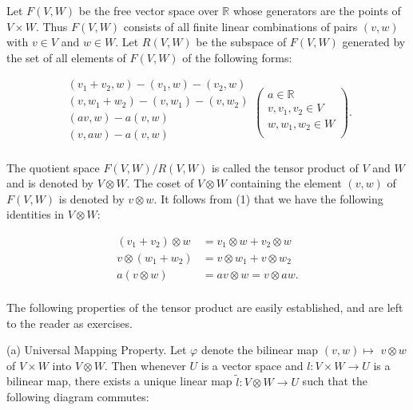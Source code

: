 \begin{definition}\label{thm:2.1}
Let $F(V,W)$ be the free vector space over $\mathbb{R}$ whose generators are the points of $V \times W$. Thus $F(V,W)$ consists of all finite linear combinations of pairs $(v,w)$ with $v \in V$ and $w \in W$. Let $R(V,W)$ be the subspace of $F(V,W)$ generated by the set of all elements of $F(V,W)$ of the following forms:

\begin{equation}
\tag{1}\label{eq:2.1:1}
\begin{array}{l}{(v_{1}+v_{2},w)-(v_{1},w)-(v_{2},w)}\\ {(v,w_{1}+w_{2})-(v,w_{1})-(v,w_{2})}\\ {(a v,w)-a(v,w)}\\ {(v,a w)-a(v,w)}\\ \end{array}\left(\begin{array}{c}{a\in\mathbb{R}}\\ {v,v_{1},v_{2}\in V}\\ {w,w_{1},w_{2}\in W}\\ \end{array}\right).
\end{equation}

The quotient space $F(V,W)/R(V,W)$ is called the tensor product of $V$ and $W$ and is denoted by $V\otimes W$. The coset of $V\otimes W$ containing the element $(v,w)$ of $F(V,W)$ is denoted by $v\otimes w$. It follows from (1) that we have the following identities in $V\otimes W$:

\[
\begin{aligned}{(v_{1}+v_{2})\otimes w}&{{}=v_{1}\otimes w+v_{2}\otimes w}\\ {v\otimes(w_{1}+w_{2})}&{{}=v\otimes w_{1}+v\otimes w_{2}}\\ {a(v\otimes w)}&{{}=a v\otimes w=v\otimes a w.}\\ \end{aligned}
\]

\end{definition}

\label{thm:2.2}
The following properties of the tensor product are easily established, and are left to the reader as exercises.

(a) Universal Mapping Property. Let $\varphi$ denote the bilinear map $(v,w)\mapsto$ $v\otimes w$ of $V\times W$ into $V\otimes W$. Then whenever $U$ is a vector space and $l:V\times W\to U$ is a bilinear map, there exists a unique linear map $\tilde{l}\colon V\otimes W\to U$ such that the following diagram commutes:


